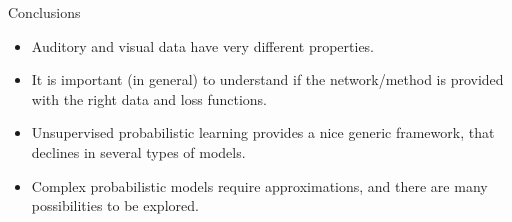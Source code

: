 \documentclass[aspectratio=169]{beamer}
\begin{document}
\begin{frame}{Conclusions}
 \begin{itemize}
  \item Auditory and visual data have very different properties.
  \item It is important (in general) to understand if the network/method is provided with the right data and loss functions.
  \item Unsupervised probabilistic learning provides a nice generic framework, that declines in several types of models.
  \item Complex probabilistic models require approximations, and there are many possibilities to be explored.
 \end{itemize}
 
\end{frame}
\end{document}
